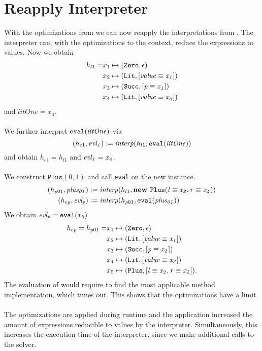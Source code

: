 \section{Reapply Interpreter} %
With the optimizations from 
we can now reapply the interpretations from .
The interpreter can, with the optimizations to the context,
reduce the expressions to values.
Now we obtain
\begin{align*}
h_{l1} = &x_1 \mapsto (\texttt{Zero}, \epsilon)\\
         &x_2 \mapsto (\texttt{Lit}, [\mathit{\mathit{value}} \equiv \mathit{x_1}])\\
         &x_3 \mapsto (\texttt{Succ}, [\mathit{\mathit{p}} \equiv \mathit{x_1}])\\
         &x_4 \mapsto (\texttt{Lit}, [\mathit{\mathit{value}} \equiv \mathit{x_3}])
\end{align*}
and $litOne = x_4$.\\
\\
We further interpret $\texttt{eval}(\mathit{litOne})$ via
\[
(h_{e1}, \mathit{evl_1}) := \mathit{interp}(h_{l1}, \texttt{eval}(\mathit{litOne}))
\]
and obtain $h_{e1} = h_{l1}$ and $\mathit{evl_1} = x_4$.\\
\\
We construct $\texttt{Plus}(0, 1)$ and call \texttt{eval}
on the new instance.
\begin{align*}
(h_{p01}, \mathit{plus_{01}}) &:= \mathit{interp}(h_{l1}, \textbf{new } \mathit{\texttt{Plus}}(\mathit{\mathit{l} \equiv \mathit{x_2}, \mathit{r} \equiv \mathit{x_4}}))\\
(h_{ep}, \mathit{evl_p}) & := \mathit{interp}(h_{p01}, \texttt{eval}(\mathit{plus_{01}}))
\end{align*}
We obtain $\mathit{evl_p} = \texttt{eval}(x_5)$
\begin{align*}
h_{ep} = h_{p01} = &x_1 \mapsto (\texttt{Zero}, \epsilon)\\
                   &x_2 \mapsto (\texttt{Lit}, [\mathit{\mathit{value}} \equiv \mathit{x_1}])\\
                   &x_3 \mapsto (\texttt{Succ}, [\mathit{\mathit{p}} \equiv \mathit{x_1}])\\
                   &x_4 \mapsto (\texttt{Lit}, [\mathit{\mathit{value}} \equiv \mathit{x_3}])\\
                   &x_5 \mapsto (\texttt{Plus}, [\mathit{l} \equiv \mathit{x_2}, \mathit{r} \equiv \mathit{x_4}]).
\end{align*}
%
The evaluation of  would require
to find the most applicable method implementation,
which times out.
This shows that the optimizations have a limit.\\
\\
The optimizations are applied during runtime and
the application increased the amount of expressions
reducible to values by the interpreter.
Simultaneously, this increases the
execution time of the interpreter,
since we make additional calls to the solver.

